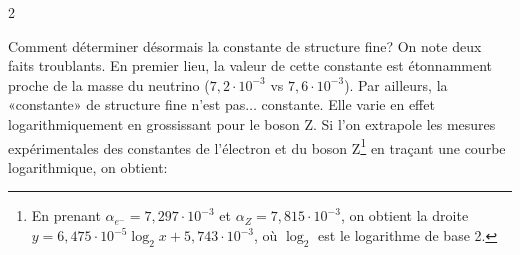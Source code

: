 \begin{multicols}{2}
\begin{center}
\end{center}

Comment déterminer désormais la constante de structure fine? On note deux faits troublants. En premier lieu, la valeur de cette constante est étonnamment proche de la masse du neutrino ($7,2\cdot10^{-3}$ vs $7,6\cdot10^{-3}$). Par ailleurs, la «constante» de structure fine n'est pas$\ldots$ constante. Elle varie en effet logarithmiquement en grossissant pour le boson Z\cite{workman2022review}. Si l'on extrapole les mesures expérimentales des constantes de l'électron et du boson Z\footnote{En prenant $\alpha_{e^-}=7,297\cdot10^{-3}$ et $\alpha_{Z}=7,815\cdot10^{-3}$, on obtient la droite $y=6,475\cdot10^{-5}\log_2{x}+5,743\cdot10^{-3}$, où $\log_2$ est le logarithme de base 2.} en traçant une courbe logarithmique, on obtient:
	

\end{multicols}
